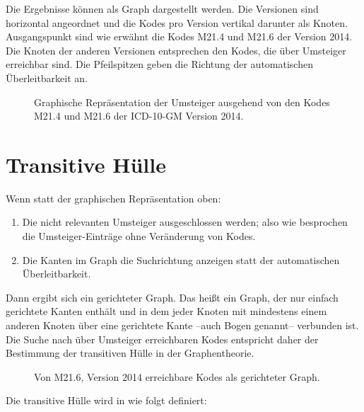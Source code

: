 Die Ergebnisse können als Graph dargestellt werden. Die Versionen sind horizontal angeordnet und die Kodes pro Version vertikal darunter als Knoten. Ausgangspunkt sind wie erwähnt die Kodes M21.4 und M21.6 der Version 2014. Die Knoten der anderen Versionen entsprechen den Kodes, die über Umsteiger erreichbar sind. Die Pfeilspitzen geben die Richtung der automatischen Überleitbarkeit an. 

\begin{figure}[H]
    \centering\Large%
    \resizebox{.99\linewidth}{!}{}
    \normalsize\caption{Graphische Repräsentation der Umsteiger ausgehend von den Kodes M21.4 und M21.6 der ICD-10-GM Version 2014.}
\end{figure}

\section{Transitive Hülle}

Wenn statt der graphischen Repräsentation oben:

\begin{enumerate}
\item Die nicht relevanten Umsteiger ausgeschlossen werden; also wie besprochen die Umsteiger-Einträge ohne Veränderung von Kodes.
\item Die Kanten im Graph die Suchrichtung anzeigen statt der automatischen Überleitbarkeit.
\end{enumerate}

Dann ergibt sich ein gerichteter Graph. Das heißt ein Graph, der nur einfach gerichtete Kanten enthält und in dem jeder Knoten mit mindestens einem anderen Knoten über eine gerichtete Kante --auch Bogen genannt-- verbunden ist. Die Suche nach über Umsteiger erreichbaren Kodes entspricht daher der Bestimmung der transitiven Hülle in der Graphentheorie. 

\begin{figure}[H]
    \centering\Large%
    \resizebox{.99\linewidth}{!}{}
    \normalsize\caption{Von M21.6, Version 2014 erreichbare Kodes als gerichteter Graph.}
\end{figure}

Die transitive Hülle wird in \cite[Seite 172]{gross2013handbook} wie folgt definiert: 

\begin{figure}[H]
    \centering
    \setlength{\fboxsep}{10pt}\color{black!20}
    \normalcolor%
\end{figure}

